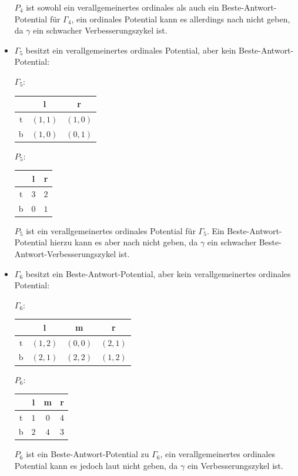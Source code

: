 \begin{bsp}
\begin{itemize}
\begin{center}
\begin{tabular}{c||c|c|c}
				\end{tabular}
			\end{center}
			$P_4$ ist sowohl ein verallgemeinertes ordinales als auch ein Beste-Antwort-Potential für $\Gamma_4$, ein ordinales Potential kann es allerdings nach  nicht geben, da $\gamma$ ein schwacher Verbesserungszykel ist.
		\item $\Gamma_5$ besitzt ein verallgemeinertes ordinales Potential, aber kein Beste-Antwort-Potential:
			\begin{center}
				$\Gamma_5:$ \quad
				\begin{tabular}{c||c|c}
						& l 		& r 		\\\hline\hline
					t	& $(1,1)$	& $(1,0)$	\\\hline
					b	& $(1,0)$	& $(0,1)$ 
				\end{tabular}\hspace{5em}
				$P_5:$ \quad
				\begin{tabular}{c||c|c}
						& l 		& r 		\\\hline\hline
					t	& $3$	& $2$			\\\hline
					b	& $0$	& $1$ 
				\end{tabular}
			\end{center}
		$P_5$ ist ein verallgemeinertes ordinales Potential für $\Gamma_5$. Ein Beste-Antwort-Potential hierzu kann es aber nach  nicht geben, da $\gamma$ ein schwacher Beste-Antwort-Verbesserungszykel ist.
		\item $\Gamma_6$ besitzt ein Beste-Antwort-Potential, aber kein verallgemeinertes ordinales Potential:
			\begin{center}
				$\Gamma_6:$ \quad
				\begin{tabular}{c||c|c|c}
						& l 		& m			& r 		\\\hline\hline
					t	& $(1,2)$	& $(0,0)$	& $(2,1)$	\\\hline
					b	& $(2,1)$	& $(2,2)$ 	& $(1,2)$
				\end{tabular}\hspace{5em}
				$P_6:$ \quad
				\begin{tabular}{c||c|c|c}
						& l 		& m 		& r \\\hline\hline
					t	& $1$	& $0$		& $4$	\\\hline
					b	& $2$	& $4$ 		& $3$
				\end{tabular}
			\end{center}
			$P_6$ ist ein Beste-Antwort-Potential zu $\Gamma_6$, ein verallgemeinertes ordinales Potential kann es jedoch laut  nicht geben, da $\gamma$ ein Verbesserungszykel ist.
	\end{itemize}
\end{bsp}

